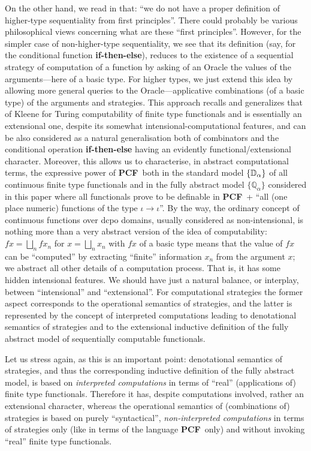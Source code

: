 \documentclass[fleqn]{LMCS}
\theoremstyle{plain}\newtheorem{satz}[thm]{Satz}
\theoremstyle{plain}\newtheorem{hyp}[thm]{Hypothesis}
\theoremstyle{plain}\newtheorem{hyps}[thm]{Hypotheses}
\theoremstyle{definition}\newtheorem{note}[thm]{Note}
\newcommand{\setof}[1]{\{#1\}}
\newcommand{\arr}{\rightarrow}
\newcommand{\bbQ}{\mathbb{Q}}
\newcommand{\PCF}{\mbox{\bf PCF}}
\newcommand{\?}{\mbox{?}}
\begin{document}
On the other hand, we read in 
\cite{Hyland-Ong2000} that: 
``we do not have a proper definition of higher-type 
sequentiality from first principles''. 
There could probably be various philosophical 
views concerning 
what are these ``first principles''. 
However, for the simpler case of non-higher-type sequentiality, 
we see that its definition (say, for the conditional 
function {\bf if-then-else}), 
reduces to the existence of a sequential strategy of 
computation of a function by asking of an Oracle the 
values of the arguments---here of a basic type. 
For higher types, 
we just extend this idea by allowing more general queries 
to the Oracle---applicative 
combinations 
(of a basic type) of the arguments and strategies. 
This approach recalls and generalizes that 
of Kleene \cite{Kleene60,Kleene62} for Turing computability of finite 
type functionals and is essentially an extensional one, 
despite its somewhat intensional-computational features, 
and can be also considered as a natural generalisation both of combinators 
and the conditional operation {\bf if-then-else} having an evidently 
functional/extensional character. 
Moreover, this allows us to characterise, in abstract computational terms, 
the expressive power of \PCF\ both in the standard model $\setof{\bbD_\alpha}$ 
of all continuous finite type functionals \cite{Saz76AL} and 
in the fully abstract model $\setof{\bbQ_\alpha}$ considered in this paper where 
all functionals prove to be definable in \PCF\ + ``all (one place 
numeric) functions of the type $\iota\arr\iota$''. 
By the way, the ordinary 
concept of continuous functions over dcpo domains, 
usually considered as non-intensional, 
is nothing more than a very abstract version of the idea of 
computability: $fx = \bigsqcup_n fx_n$ for $x=\bigsqcup_n x_n$ with $fx$ of a basic type 
means that the value of $fx$ can be ``computed'' by extracting ``finite'' information 
$x_n$ from the argument $x$; we abstract all other details of a computation process. 
That is, it has some hidden 
intensional features. We should have just a natural balance, or interplay, 
between ``intensional'' and ``extensional''. 
For computational strategies the former aspect corresponds to the operational 
semantics of strategies, and the latter is represented by the concept of 
interpreted computations leading to denotational semantics of strategies and 
to the extensional inductive definition of the fully abstract model of 
sequentially computable functionals. 

Let us stress again, as this is an important point: 
denotational semantics of strategies, and thus 
the corresponding inductive definition of the fully abstract model, is based on 
\emph{interpreted computations} in terms of ``real'' (applications of) 
finite type functionals. Therefore it has, despite computations involved, 
rather an extensional character, whereas the operational semantics of 
(combinations of) strategies is based on purely ``syntactical'', 
\emph{non-interpreted computations} 
in terms of strategies only (like in terms of the language \PCF\ only) 
and without invoking ``real'' finite type 
functionals.
\end{document}
